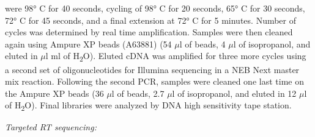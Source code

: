 \documentclass[times, twoside]{zHenriquesLab-StyleBioRxiv}
\begin{document}
were 98° C for 40 seconds, cycling of 98° C for 20 seconds, 65° C for 30 seconds, 72° C for 45 seconds, and a final extension at 72° C for 5 minutes. Number of cycles was determined by real time amplification. Samples were then cleaned again using Ampure XP beads (A63881) (54 \(\mu\)l of beads, 4 \(\mu\)l of isopropanol, and eluted in \(\mu\)l ml of H\textsubscript{2}O). Eluted cDNA was amplified for three more cycles using a second set of oligonucleotides for Illumina sequencing in a NEB Next master mix reaction. Following the second PCR, samples were cleaned one last time on the Ampure XP beads (36 \(\mu\)l of beads, 2.7 \(\mu\)l of isopropanol, and eluted in 12 \(\mu\)l of H\textsubscript{2}O). Final libraries were analyzed by DNA high sensitivity tape station. 

\textit{Targeted RT sequencing:} \newline
\end{document}
